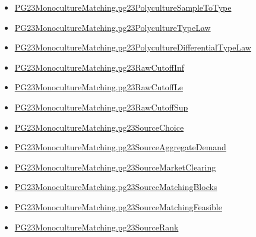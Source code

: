 \documentclass[10pt]{article}
\begin{document}
\begin{itemize}[leftmargin=1.2em]
\begin{itemize}[leftmargin=1.2em]
\item \hyperlink{paper-prerequisite-e03d7d6d87f62fdc}{PG23\allowbreak{}Monoculture\allowbreak{}Matching.\allowbreak{}pg23\allowbreak{}Polyculture\allowbreak{}Sample\allowbreak{}To\allowbreak{}Type}
\item \hyperlink{paper-prerequisite-57a6e28ae64a74da}{PG23\allowbreak{}Monoculture\allowbreak{}Matching.\allowbreak{}pg23\allowbreak{}Polyculture\allowbreak{}Type\allowbreak{}Law}
\item \hyperlink{paper-prerequisite-77e418f4c944c6e4}{PG23\allowbreak{}Monoculture\allowbreak{}Matching.\allowbreak{}pg23\allowbreak{}Polyculture\allowbreak{}Differential\allowbreak{}Type\allowbreak{}Law}
\item \hyperlink{paper-prerequisite-39d91b9ceeab6598}{PG23\allowbreak{}Monoculture\allowbreak{}Matching.\allowbreak{}pg23\allowbreak{}Raw\allowbreak{}Cutoff\allowbreak{}Inf}
\item \hyperlink{paper-prerequisite-9c6e6dc2f90cbb07}{PG23\allowbreak{}Monoculture\allowbreak{}Matching.\allowbreak{}pg23\allowbreak{}Raw\allowbreak{}Cutoff\allowbreak{}Le}
\item \hyperlink{paper-prerequisite-7050c951708d3ed6}{PG23\allowbreak{}Monoculture\allowbreak{}Matching.\allowbreak{}pg23\allowbreak{}Raw\allowbreak{}Cutoff\allowbreak{}Sup}
\item \hyperlink{paper-prerequisite-1c7877b588e0c9b6}{PG23\allowbreak{}Monoculture\allowbreak{}Matching.\allowbreak{}pg23\allowbreak{}Source\allowbreak{}Choice}
\item \hyperlink{paper-prerequisite-3fb2e1ac28891e7d}{PG23\allowbreak{}Monoculture\allowbreak{}Matching.\allowbreak{}pg23\allowbreak{}Source\allowbreak{}Aggregate\allowbreak{}Demand}
\item \hyperlink{paper-prerequisite-55bbf5d44984bdf1}{PG23\allowbreak{}Monoculture\allowbreak{}Matching.\allowbreak{}pg23\allowbreak{}Source\allowbreak{}Market\allowbreak{}Clearing}
\item \hyperlink{paper-prerequisite-f53623070977fa8a}{PG23\allowbreak{}Monoculture\allowbreak{}Matching.\allowbreak{}pg23\allowbreak{}Source\allowbreak{}Matching\allowbreak{}Blocks}
\item \hyperlink{paper-prerequisite-500c3d3f4de9e8d5}{PG23\allowbreak{}Monoculture\allowbreak{}Matching.\allowbreak{}pg23\allowbreak{}Source\allowbreak{}Matching\allowbreak{}Feasible}
\item \hyperlink{paper-prerequisite-5b8974902ba221f5}{PG23\allowbreak{}Monoculture\allowbreak{}Matching.\allowbreak{}pg23\allowbreak{}Source\allowbreak{}Rank}

\end{itemize}
\end{itemize}
\end{document}
